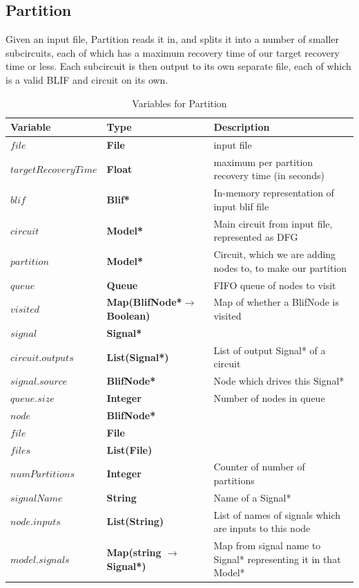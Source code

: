 \documentclass[12pt,final,oneside]{dwThesis} %
\begin{document}
   \subsection{Partition}\label{algPartition}
   Given an input file, Partition reads it in, and splits it into a number of smaller subcircuits, each of which has a maximum recovery time of our target recovery time or less. Each subcircuit is then output to its own separate file, each of which is a valid \ac{BLIF} and circuit on its own.
   \begin{table}
      \begin{center}
         \begin{tabularx}{\linewidth}{llX}
            \toprule
            Variable & Type & Description\\
            \midrule
            $file$ &\textbf{ File  } &  input file\\
            $targetRecoveryTime$ &\textbf{ Float } &  maximum per partition recovery time (in seconds)\\
            $blif$ &\textbf{  Blif* } &  In-memory representation of input blif file\\
            $circuit$ &\textbf{   Model* } &  Main circuit from input file, represented as DFG\\
            $partition$ &\textbf{   Model* } &  Circuit, which we are adding nodes to, to make our partition\\
            $queue$ &\textbf{  Queue } &  FIFO queue of nodes to visit\\
            $visited$ &\textbf{   Map(BlifNode*$\to$ Boolean)} &  Map of whether a BlifNode is visited\\
            $signal$ &\textbf{  Signal* } &  \\
            $circuit.outputs$ &\textbf{  List(Signal*) } &  List of output Signal* of a circuit\\
            $signal.source$ &\textbf{  BlifNode* } &  Node which drives this Signal*\\
            $queue.size$ &\textbf{ Integer } &  Number of nodes in queue\\
            $node$ &\textbf{  BlifNode* } &  \\
            $file$ &\textbf{  File } &  \\
            $files$ &\textbf{  List(File) } &  \\
            $numPartitions$ &\textbf{ Integer } &  Counter of number of partitions\\
            $signalName$ &\textbf{ String } &  Name of a Signal*\\
            $node.inputs$ &\textbf{  List(String) } &  List of names of signals which are inputs to this node\\
            $model.signals$ &\textbf{  Map(string $\to$ Signal*) } &  Map from signal name to Signal* representing it in that Model*\\
            \bottomrule
         \end{tabularx}
         \caption{Variables for Partition}
         \label{varPart}
      \end{center}
   \end{table}
\end{document}
